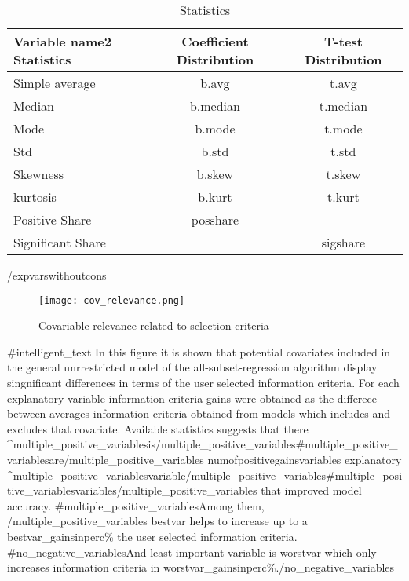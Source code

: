 \documentclass{article}
\begin{document}
\begin{table}[!h]
    \centering
    \caption{Statistics}
    \begin{tabular}{|l|c|c|}
    \hline
    Variable {{{name2}}} Statistics &  Coefficient Distribution &  T-test Distribution  \\
    \hline
    \hline
    Simple average    & {{b.avg}}      & {{t.avg}} \\
    \hline
    Median            & {{b.median}}   & {{t.median}} \\
    \hline
    Mode              & {{b.mode}}     & {{t.mode}} \\
    \hline
    Std               & {{b.std}}      & {{t.std}} \\
    \hline
    Skewness          & {{b.skew}}     & {{t.skew}} \\
    \hline
    kurtosis          & {{b.kurt}}     & {{t.kurt}} \\
    \hline
    Positive Share    & {{posshare}} &  \\
    \hline
    Significant Share &  & {{sigshare}} \\
    \hline
    \end{tabular}
\end{table}

\clearpage
{{/expvarswithoutcons}}

\begin{figure}[!ht]
    \centering
    \caption{Covariable relevance related to selection criteria}
    \texttt{[image: cov\_relevance.png]}
\end{figure}

{{#intelligent_text}}
In this figure it is shown that potential covariates included in the general unrrestricted model of the all-subset-regression algorithm display singnificant differences in terms of the user selected information criteria. For each explanatory variable information criteria gains were obtained as the differece between averages information criteria obtained from models which includes and excludes that covariate. Available statistics suggests that there {{^multiple_positive_variables}}is{{/multiple_positive_variables}}{{#multiple_positive_variables}}are{{/multiple_positive_variables}} {{numofpositivegainsvariables}} explanatory {{^multiple_positive_variables}}variable{{/multiple_positive_variables}}{{#multiple_positive_variables}}variables{{/multiple_positive_variables}} that improved model accuracy. {{#multiple_positive_variables}}Among them, {{/multiple_positive_variables}} {{ bestvar }} helps to increase up to a {{bestvar_gainsinperc}}\% the user selected information criteria. {{#no_negative_variables}}And least important variable is {{ worstvar }} which only increases information criteria in {{worstvar_gainsinperc}}\%.{{/no_negative_variables}}
\end{document}
